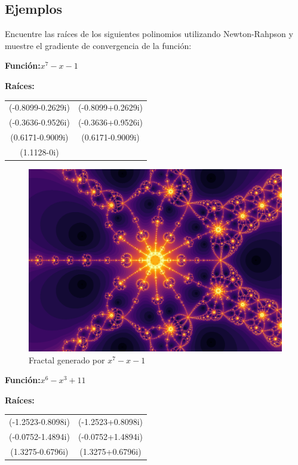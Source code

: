 \subsection{Ejemplos} 
Encuentre  las raíces de los siguientes polinomios utilizando Newton-Rahpson y muestre el gradiente de convergencia de la función:


\textbf{Función:}$x^7-x-1$

\textbf{Raíces:}

\begin{center}
\begin{tabular}{ c c }
 (-0.8099-0.2629i) & (-0.8099+0.2629i) \\
 (-0.3636-0.9526i) & (-0.3636+0.9526i) \\
 (0.6171-0.9009i) & (0.6171-0.9009i) \\  
 (1.1128-0i)  
\end{tabular}
\end{center}


\begin{figure}[H]
    \centering
    \includegraphics[scale=0.26]{images/ej1.png}
    \caption{Fractal generado por $x^7-x-1$}
    \label{fig:ej_1}
\end{figure}

\textbf{Función:}$x^6-x^3+11$

\textbf{Raíces:}

\begin{center}
\begin{tabular}{ c c }
 (-1.2523-0.8098i) & (-1.2523+0.8098i) \\
 (-0.0752-1.4894i) & (-0.0752+1.4894i) \\
 (1.3275-0.6796i) & (1.3275+0.6796i)
\end{tabular}
\end{center}

